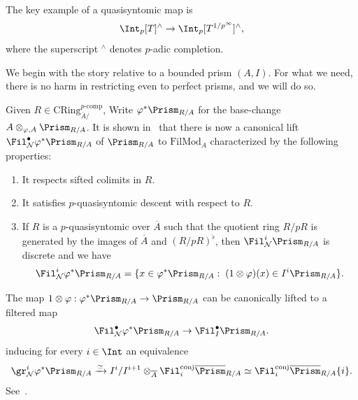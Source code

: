 \documentclass[10pt]{amsart}
\begin{document}
\begin{example}
The key example of a quasisyntomic map is
\[
\Int_p[T]^{\wedge}\to \Int_p[T^{1/p^\infty}]^{\wedge},
\]
where the superscript ${}^\wedge$ denotes $p$-adic completion. 
\end{example}

\begin{remark}
\label{rem:relative_nygaard}
We begin with the story relative to a bounded prism $(A,I)$. For what we need, there is no harm in restricting even to perfect prisms, and we will do so.

Given $R\in \mathrm{CRing}^{p\text{-comp}}_{\overline{A}/}$,  Write $\varphi^*\Prism_{R/A}$ for the base-change $A\otimes_{\varphi,A}\Prism_{R/A}$. It is shown in~\cite[\S 5.1]{bhatt2022absolute} that there is now a canonical lift $\Fil^\bullet_{\mathcal{N}}\varphi^*\Prism_{R/A}$ of $\Prism_{R/A}$ to $\mathrm{FilMod}_{A}$ characterized by the following properties:
\begin{enumerate}
   \item It respects sifted colimits in $R$.
   \item It satisfies $p$-quasisyntomic descent with respect to $R$.
   \item If $R$ is a $p$-quasisyntomic over $\overline{A}$ such that the quotient ring $R/pR$ is generated by the images of $\overline{A}$ and $(R/pR)^{\flat}$, then $\Fil^i_{\mathcal{N}}\Prism_{R/A}$ is discrete and we have
   \[
    \Fil^i_{\mathcal{N}}\varphi^*\Prism_{R/A} = \{x\in \varphi^*\Prism_{R/A}:\; (1\otimes\varphi)(x)\in I^i\Prism_{R/A}\}.
   \]
\end{enumerate}
\end{remark}


\begin{remark}
\label{rem:filtered_frob_rel_nygaard}
The map $1\otimes\varphi:\varphi^*\Prism_{R/A}\to \Prism_{R/A}$ can be canonically lifted to a filtered map
   \[
    \Fil^\bullet_{\mathcal{N}}\varphi^*\Prism_{R/A}\to \Fil^\bullet_I\Prism_{R/A}.
   \]
inducing for every $i\in\Int$ an equivalence
   \[
   \gr^i_{\mathcal{N}}\varphi^*\Prism_{R/A}\xrightarrow{\simeq}I^i/I^{i+1}\otimes_{\overline{A}}\Fil^{\mathrm{conj}}_i\overline{\Prism}_{R/A}\simeq \Fil^{\mathrm{conj}}_i\overline{\Prism}_{R/A}\{i\}.
\]
See~\cite[Remark 5.1.2]{bhatt2022absolute}.
\end{remark}
\end{document}
